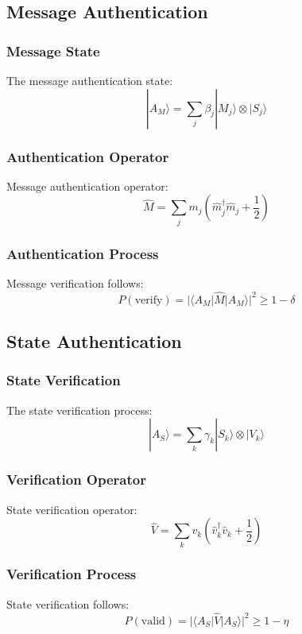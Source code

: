 \documentclass[12pt]{article}
\begin{document}
\subsection{Message Authentication}
\subsubsection{Message State}
The message authentication state:
\begin{equation}
|A_M\rangle = \sum_j \beta_j|M_j\rangle \otimes |S_j\rangle
\end{equation}
\subsubsection{Authentication Operator}
Message authentication operator:
\begin{equation}
\hat{M} = \sum_j m_j(\hat{m}_j^\dagger\hat{m}_j + \frac{1}{2})
\end{equation}
\subsubsection{Authentication Process}
Message verification follows:
\begin{equation}
P(\text{verify}) = |\langle A_M|\hat{M}|A_M\rangle|^2 \geq 1 - \delta
\end{equation}
\subsection{State Authentication}
\subsubsection{State Verification}
The state verification process:
\begin{equation}
|A_S\rangle = \sum_k \gamma_k|S_k\rangle \otimes |V_k\rangle
\end{equation}
\subsubsection{Verification Operator}
State verification operator:
\begin{equation}
\hat{V} = \sum_k v_k(\hat{v}_k^\dagger\hat{v}_k + \frac{1}{2})
\end{equation}
\subsubsection{Verification Process}
State verification follows:
\begin{equation}
P(\text{valid}) = |\langle A_S|\hat{V}|A_S\rangle|^2 \geq 1 - \eta
\end{equation}
\end{document}
